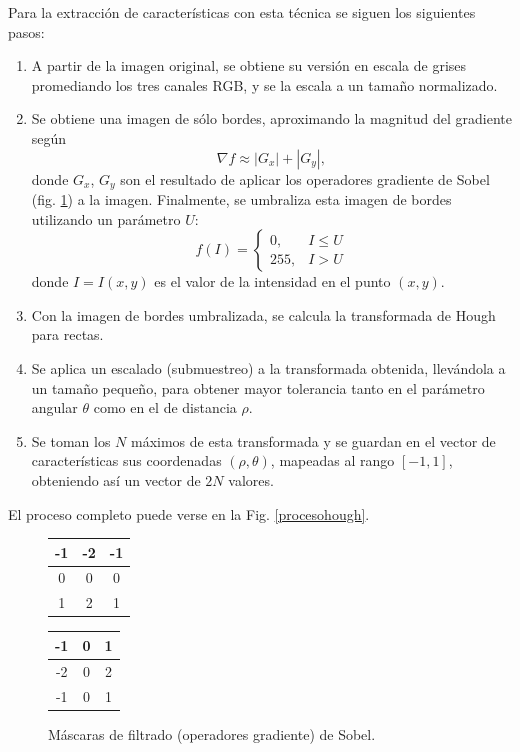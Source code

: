 \documentclass[conference,a4paper,10pt,oneside,final]{tfmpd}
\begin{document}
Para la extracción de características con esta técnica se siguen los siguientes
pasos:
\begin{enumerate}
\item A partir de la imagen original, se obtiene su versión en escala de grises
      promediando los tres canales RGB, y se la escala a un tamaño normalizado.
\item Se obtiene una imagen de sólo bordes, aproximando la magnitud del
      gradiente según
      \begin{equation}
      \label{sob}
      \nabla f \approx |G_x| + |G_y|,
      \end{equation}
      donde $G_x$, $G_y$ son el resultado de aplicar los o\-pe\-ra\-do\-res
      gradiente  de Sobel \cite{gonzalez+woods} (fig. \ref{masksobel}) a la
      imagen. Finalmente, se umbraliza esta imagen de bordes utilizando un
      parámetro $U$:
      \begin{equation}
      \label{umbral}
      f(I)=
      \begin{cases}
      0, & I\leq U\\
      255, & I > U
      \end{cases}
      \end{equation}
      {donde $I=I(x,y)$ es el valor de la intensidad en el punto $(x,y)$.}
\item Con la imagen de bordes umbralizada, se calcula la trans\-for\-ma\-da de
      Hough para rectas.
\item Se aplica un escalado (submuestreo) a la transformada obtenida, llevándola
      a un tamaño pequeño, para obtener mayor tolerancia tanto en el parámetro
      angular $\theta$ como en el de distancia $\rho$.
\item Se toman los $N$ máximos de esta transformada y se guardan en el vector de
      características sus coordenadas $(\rho,\theta)$, mapeadas al rango
      $[-1,1]$, obteniendo así un vector de $2N$ valores.
\end{enumerate}
El proceso completo puede verse en la Fig. \ref{procesohough}.
\begin{figure}
\begin{center}
\begin{tabular}{|c|c|c|}
\hline -1 & -2 & -1 \\\hline 0 & 0 & 0 \\\hline 1 & 2 & 1 \\\hline
\end{tabular}
\begin{tabular}{|c|c|c|}
\hline -1 & 0 & 1 \\\hline -2 & 0 & 2 \\\hline -1 & 0 & 1 \\\hline
\end{tabular}
\end{center}
\caption{Máscaras de filtrado (operadores gradiente) de Sobel.}
\label{masksobel}
\end{figure}
\end{document}
